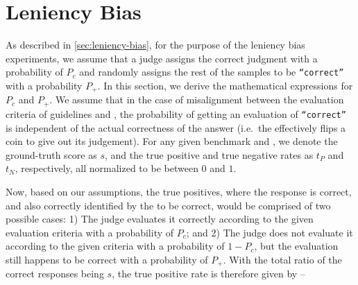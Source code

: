 

\section{Leniency Bias}\label{app:leniency-bias}

As described in \cref{sec:leniency-bias}, for the purpose of the leniency bias experiments, we assume that a judge assigns the correct judgment with a probability of $P_c$ and randomly assigns the rest of the samples to be \texttt{“correct”} with a probability $P_+$.
%
In this section, we derive the mathematical expressions for $P_c$ and $P_+$. We assume that in the case of misalignment between the evaluation criteria of guidelines and \judgemodels, the probability of getting an evaluation of \texttt{``correct''} is independent of the actual correctness of the answer (i.e.\ the \judgemodel effectively flips a coin to give out its judgement). For any given benchmark and \judgemodel, we denote the ground-truth score as $s$, and the true positive and true negative rates as $t_P$ and $t_N$, respectively, all normalized to be between $0$ and $1$.

Now, based on our assumptions, the true positives, where the \evaluatormodel response is correct, and also correctly identified by the \judgemodel to be correct, would be comprised of two possible cases: 1) The judge evaluates it correctly according to the given evaluation criteria with a probability of $P_c$; and 2) The judge does not evaluate it according to the given criteria with a probability of $1-P_c$, but the evaluation still happens to be correct with a probability of $P_+$. With the total ratio of the correct responses being $s$, the true positive rate is therefore given by --

